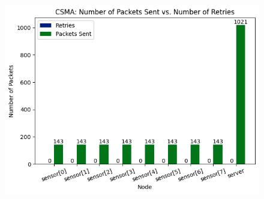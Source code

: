 \begin{frame}
\begin{columns}[T]
\begin{column}{.48\textwidth}
\begin{figure}
                \label{fig:ack}
                \vspace{-0.75cm}
            \end{figure}
            \begin{figure}
                \centering
                \includegraphics[width=\linewidth]{images/noack.png}
                \label{fig:noack}
            \end{figure}
        \end{column}
    \end{columns}
\end{frame}


